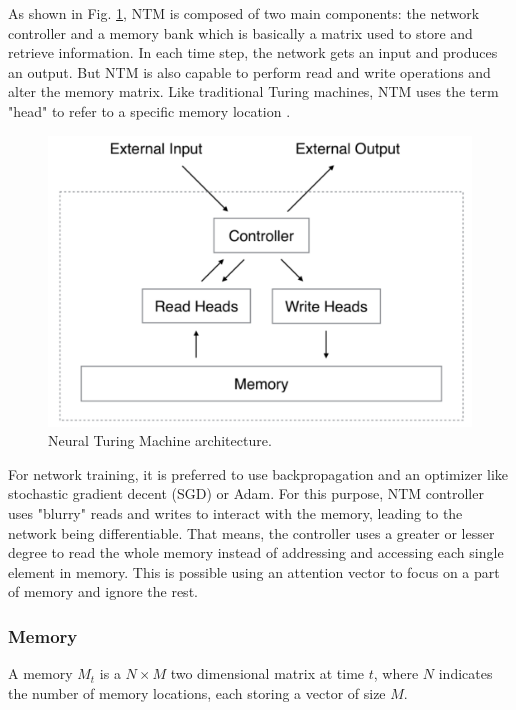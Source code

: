 \documentclass[acmsmall]{acmart}
\begin{document}
As shown in Fig. \ref{fig:ntmarch}, NTM is composed of two main components: the network controller and a memory bank which is basically a matrix used to store and retrieve information. In each time step, the network gets an input and produces an output. But NTM is also capable to perform read and write operations and alter the memory matrix. Like traditional Turing machines, NTM uses the term "head" to refer to a specific memory location \cite{}.

\begin{figure}[h]
	\centering
	\includegraphics[scale=0.15]{figures/ntmarch}
	\caption{Neural Turing Machine architecture.}
	\label{fig:ntmarch}
\end{figure}

For network training, it is preferred to use backpropagation and an optimizer like stochastic gradient decent (SGD) or Adam. For this purpose, NTM controller uses "blurry" reads and writes to interact with the memory, leading to the network being differentiable. That means, the controller uses a greater or lesser degree to read the whole memory instead of addressing and accessing each single element in memory. This is possible using an attention vector to focus on a part of memory and ignore the rest.

\subsubsection{Memory}
A memory $M_{t}$ is a $N \times M$ two dimensional matrix at time $t$, where $N$ indicates the number of memory locations, each storing a vector of size $M$.
\end{document}
